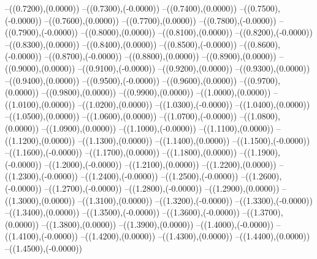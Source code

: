 {	--({\sx*(0.7200)},{\sy*(0.0000)})
	--({\sx*(0.7300)},{\sy*(-0.0000)})
	--({\sx*(0.7400)},{\sy*(0.0000)})
	--({\sx*(0.7500)},{\sy*(-0.0000)})
	--({\sx*(0.7600)},{\sy*(0.0000)})
	--({\sx*(0.7700)},{\sy*(0.0000)})
	--({\sx*(0.7800)},{\sy*(-0.0000)})
	--({\sx*(0.7900)},{\sy*(-0.0000)})
	--({\sx*(0.8000)},{\sy*(0.0000)})
	--({\sx*(0.8100)},{\sy*(0.0000)})
	--({\sx*(0.8200)},{\sy*(-0.0000)})
	--({\sx*(0.8300)},{\sy*(0.0000)})
	--({\sx*(0.8400)},{\sy*(0.0000)})
	--({\sx*(0.8500)},{\sy*(-0.0000)})
	--({\sx*(0.8600)},{\sy*(-0.0000)})
	--({\sx*(0.8700)},{\sy*(-0.0000)})
	--({\sx*(0.8800)},{\sy*(0.0000)})
	--({\sx*(0.8900)},{\sy*(0.0000)})
	--({\sx*(0.9000)},{\sy*(0.0000)})
	--({\sx*(0.9100)},{\sy*(-0.0000)})
	--({\sx*(0.9200)},{\sy*(0.0000)})
	--({\sx*(0.9300)},{\sy*(0.0000)})
	--({\sx*(0.9400)},{\sy*(0.0000)})
	--({\sx*(0.9500)},{\sy*(-0.0000)})
	--({\sx*(0.9600)},{\sy*(0.0000)})
	--({\sx*(0.9700)},{\sy*(0.0000)})
	--({\sx*(0.9800)},{\sy*(0.0000)})
	--({\sx*(0.9900)},{\sy*(0.0000)})
	--({\sx*(1.0000)},{\sy*(0.0000)})
	--({\sx*(1.0100)},{\sy*(0.0000)})
	--({\sx*(1.0200)},{\sy*(0.0000)})
	--({\sx*(1.0300)},{\sy*(-0.0000)})
	--({\sx*(1.0400)},{\sy*(0.0000)})
	--({\sx*(1.0500)},{\sy*(0.0000)})
	--({\sx*(1.0600)},{\sy*(0.0000)})
	--({\sx*(1.0700)},{\sy*(-0.0000)})
	--({\sx*(1.0800)},{\sy*(0.0000)})
	--({\sx*(1.0900)},{\sy*(0.0000)})
	--({\sx*(1.1000)},{\sy*(-0.0000)})
	--({\sx*(1.1100)},{\sy*(0.0000)})
	--({\sx*(1.1200)},{\sy*(0.0000)})
	--({\sx*(1.1300)},{\sy*(0.0000)})
	--({\sx*(1.1400)},{\sy*(0.0000)})
	--({\sx*(1.1500)},{\sy*(-0.0000)})
	--({\sx*(1.1600)},{\sy*(-0.0000)})
	--({\sx*(1.1700)},{\sy*(0.0000)})
	--({\sx*(1.1800)},{\sy*(0.0000)})
	--({\sx*(1.1900)},{\sy*(-0.0000)})
	--({\sx*(1.2000)},{\sy*(-0.0000)})
	--({\sx*(1.2100)},{\sy*(0.0000)})
	--({\sx*(1.2200)},{\sy*(0.0000)})
	--({\sx*(1.2300)},{\sy*(-0.0000)})
	--({\sx*(1.2400)},{\sy*(-0.0000)})
	--({\sx*(1.2500)},{\sy*(-0.0000)})
	--({\sx*(1.2600)},{\sy*(-0.0000)})
	--({\sx*(1.2700)},{\sy*(-0.0000)})
	--({\sx*(1.2800)},{\sy*(-0.0000)})
	--({\sx*(1.2900)},{\sy*(0.0000)})
	--({\sx*(1.3000)},{\sy*(0.0000)})
	--({\sx*(1.3100)},{\sy*(0.0000)})
	--({\sx*(1.3200)},{\sy*(-0.0000)})
	--({\sx*(1.3300)},{\sy*(-0.0000)})
	--({\sx*(1.3400)},{\sy*(0.0000)})
	--({\sx*(1.3500)},{\sy*(-0.0000)})
	--({\sx*(1.3600)},{\sy*(-0.0000)})
	--({\sx*(1.3700)},{\sy*(0.0000)})
	--({\sx*(1.3800)},{\sy*(0.0000)})
	--({\sx*(1.3900)},{\sy*(0.0000)})
	--({\sx*(1.4000)},{\sy*(-0.0000)})
	--({\sx*(1.4100)},{\sy*(-0.0000)})
	--({\sx*(1.4200)},{\sy*(0.0000)})
	--({\sx*(1.4300)},{\sy*(0.0000)})
	--({\sx*(1.4400)},{\sy*(0.0000)})
	--({\sx*(1.4500)},{\sy*(-0.0000)})
}
